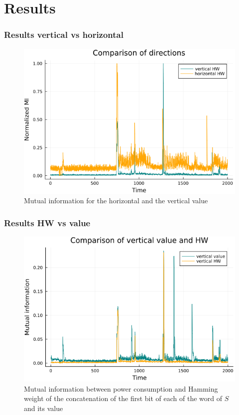 \documentclass{beamer}
\begin{document}
	\section{Results}
	\begin{frame}
		\frametitle{Results vertical vs horizontal}
		\begin{figure}[h]
			\centering
			\includegraphics[scale=0.3]{img_files/h_and_v_one_byte}
			\caption{Mutual information for the horizontal and the vertical value}
			\label{hvval}
		\end{figure}
	\end{frame}
	
	\begin{frame}
		\frametitle{Results HW vs value}
		\begin{figure}
			\centering
			\includegraphics[scale=0.3]{img_files/vertical_one_bit}
			\caption{Mutual information between power consumption and Hamming weight of the concatenation of the first bit of each of the word of $S$ and its value}
			\label{vHW}
		\end{figure}
	\end{frame}
	
\end{document}
